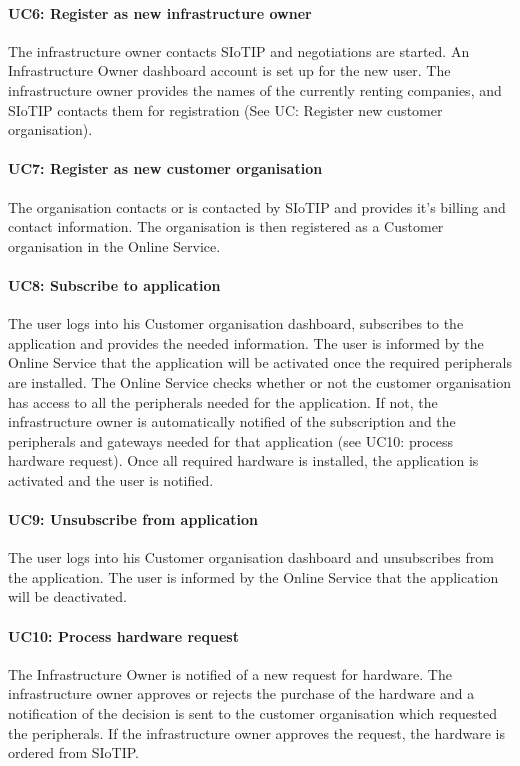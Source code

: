 \paragraph{UC6: Register as new infrastructure owner}
The infrastructure owner contacts SIoTIP and negotiations are started. An Infrastructure Owner dashboard account is set up for the new user. The infrastructure owner provides the names of the currently renting companies, and SIoTIP contacts them for registration (See UC: Register new customer organisation).

\paragraph{UC7: Register as new customer organisation}
The organisation contacts or is contacted by SIoTIP and provides it's billing and contact information. The organisation is then registered as a Customer organisation in the Online Service.

\paragraph{UC8: Subscribe to application}
The user logs into his Customer organisation dashboard, subscribes to the application and provides the needed information. The user is informed by the Online Service that the application will be activated once the required peripherals are installed. The Online Service checks whether or not the customer organisation has access to all the peripherals needed for the application. If not, the infrastructure owner is automatically notified of the subscription and the peripherals and gateways needed for that application (see UC10: process hardware request). Once all required hardware is installed, the application is activated and the user is notified.

\paragraph{UC9: Unsubscribe from application}
The user logs into his Customer organisation dashboard and unsubscribes from the application. The user is informed by the Online Service that the application will be deactivated.

\paragraph{UC10: Process hardware request}
The Infrastructure Owner is notified of a new request for hardware. The infrastructure owner approves or rejects the purchase of the hardware and a notification of the decision is sent to the customer organisation which requested the peripherals. If the infrastructure owner approves the request, the hardware is ordered from SIoTIP.

